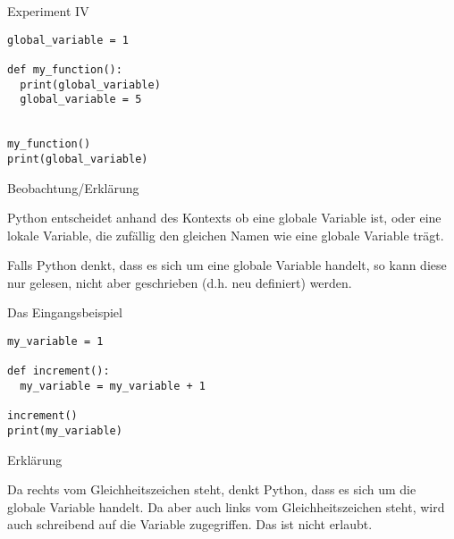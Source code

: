 \begin{fragile}
	
\begin{block}{Experiment IV}
\vspace{2pt}

\begin{verbatim}
global_variable = 1

def my_function(): 
  print(global_variable)
  global_variable = 5


my_function()
print(global_variable)
\end{verbatim}
\vspace{12pt}

\end{block}

\begin{exampleblock}{Beobachtung/Erklärung}

\pause 

Python entscheidet anhand des Kontexts ob  eine globale Variable ist, oder eine lokale Variable, die zufällig den gleichen Namen wie eine globale Variable trägt. 

\pause 

Falls Python denkt, dass es sich um eine globale Variable handelt, so kann diese nur gelesen, nicht aber geschrieben (d.h. neu definiert) werden. 

\end{exampleblock}

	
\end{fragile}


\begin{fragile}
	
\begin{block}{Das Eingangsbeispiel}
\vspace{2pt}

\begin{verbatim}
my_variable = 1

def increment(): 
  my_variable = my_variable + 1

increment()
print(my_variable)
\end{verbatim}

\vspace{12pt}

\end{block}

\begin{exampleblock}{Erklärung}

\pause 

Da  rechts vom Gleichheitszeichen steht, denkt Python, dass es sich um die globale Variable  handelt. Da  aber auch links vom Gleichheitszeichen steht, wird auch schreibend auf die Variable zugegriffen. Das ist nicht erlaubt. 

\end{exampleblock}
	
\end{fragile}


